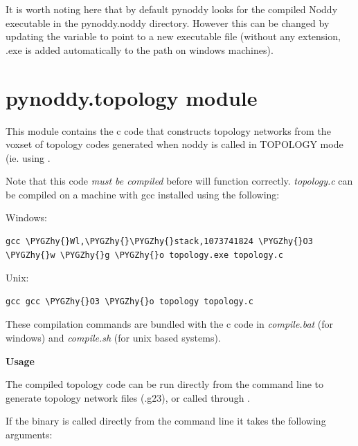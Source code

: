 \documentclass[a4paper,10pt,english]{sphinxmanual}
\def\PYGZhy{\char`\-}
\begin{document}
It is worth noting here that by default pynoddy looks for the compiled Noddy executable in the pynoddy.noddy directory. However
this can be changed by updating the  variable to point to a new executable file (without any extension, .exe
is added automatically to the path on windows machines).


\chapter{pynoddy.topology module}
\label{topology:pynoddy-topology-module}\label{topology::doc}
This module contains the c code that constructs topology networks from the voxset of
topology codes generated when noddy is called in TOPOLOGY mode (ie. using
.

Note that this code \emph{must be compiled} before 
will function correctly. \emph{topology.c} can be compiled on a machine with gcc installed
using the following:

Windows:

\begin{Verbatim}[commandchars=\\\{\}]
gcc \PYGZhy{}Wl,\PYGZhy{}\PYGZhy{}stack,1073741824 \PYGZhy{}O3 \PYGZhy{}w \PYGZhy{}g \PYGZhy{}o topology.exe topology.c
\end{Verbatim}

Unix:

\begin{Verbatim}[commandchars=\\\{\}]
gcc gcc \PYGZhy{}O3 \PYGZhy{}o topology topology.c
\end{Verbatim}

These compilation commands are bundled with the c code in \emph{compile.bat} (for windows) and
\emph{compile.sh} (for unix based systems).

\textbf{Usage}

The compiled topology code can be run directly from the command line to generate topology
network files (.g23), or called through .

If the binary is called directly from the command line it takes the following arguments:
\end{document}
